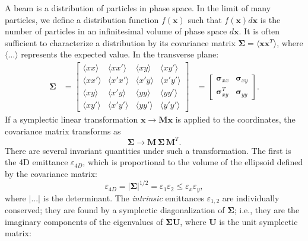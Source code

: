 A beam is a distribution of particles in phase space. In the limit of many particles, we define a distribution function $f(\mathbf{x})$ such that $f(\mathbf{x}) d\mathbf{x}$ is the number of particles in an infinitesimal volume of phase space $d\mathbf{x}$. It is often sufficient to characterize a distribution by its covariance matrix {$\bm{\Sigma} = \langle{\mathbf{x}\mathbf{x}^T}\rangle$}, where $\langle{\dots}\rangle$ represents the expected value. In the transverse plane:
%
\begin{equation}\label{eq:covariance_matrix}
\begin{aligned}
    \bm{\Sigma} &= 
    \begin{bmatrix}
        \langle{xx}\rangle & \langle{xx'}\rangle & \langle{xy}\rangle & \langle{xy'}\rangle \\
        \langle{xx'}\rangle & \langle{x'x'}\rangle & \langle{x'y}\rangle & \langle{x'y'}\rangle \\
        \langle{xy}\rangle & \langle{x'y}\rangle & \langle{yy}\rangle & \langle{yy'}\rangle \\
        \langle{xy'}\rangle & \langle{x'y'}\rangle & \langle{yy'}\rangle & \langle{y'y'}\rangle 
    \end{bmatrix}
    &= 
    \begin{bmatrix}
        \bm{\sigma}_{xx} & \bm{\sigma}_{xy} \\
        \bm{\sigma}^T_{xy} & \bm{\sigma}_{yy}
    \end{bmatrix}.
\end{aligned}
\end{equation}
%
If a symplectic linear transformation $\mathbf{x} \rightarrow \mathbf{M}\mathbf{x}$ is applied to the coordinates, the covariance matrix transforms as
%
\begin{equation}\label{covariance_matrix_transport}
    \bm{\Sigma} 
    \rightarrow 
    \mathbf{M} \, \bm{\Sigma} \, \mathbf{M}^T.
\end{equation}
%
There are several invariant quantities under such a transformation. The first is the 4D emittance $\varepsilon_{4D}$, which is proportional to the volume of the ellipsoid defined by the covariance matrix:
%
\begin{equation} 
    \varepsilon_{4D} = \left|{\bm{\Sigma}}\right|^{1/2} = \varepsilon_1\varepsilon_2 \le \varepsilon_x\varepsilon_y,
\end{equation}
%
where $|...|$ is the determinant. The \textit{intrinsic} emittances $\varepsilon_{1,2}$ are individually conserved; they are found by a symplectic diagonalization of $\bm{\Sigma}$; i.e., they are the imaginary components of the eigenvalues of $\bm{\Sigma}\mathbf{U}$, where $\mathbf{U}$ is the unit symplectic matrix:
